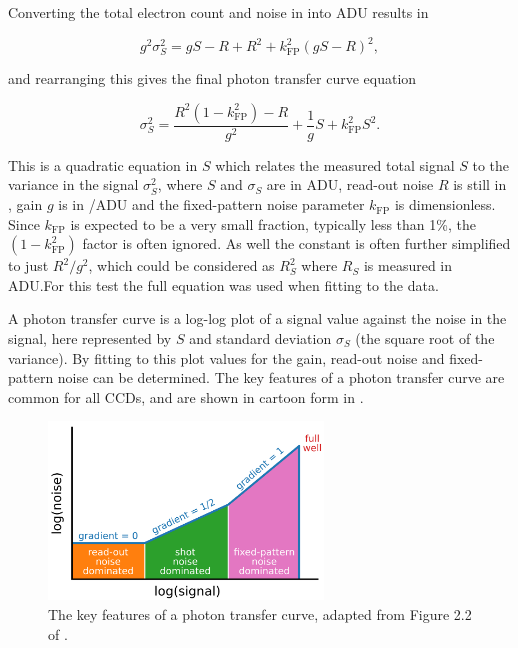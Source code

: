 \begin{colsection}
\begin{colsection}
Converting the total electron count and noise in  into ADU results in

\begin{equation}
    g^2\sigma_S^2 = gS - R + R^2 + k_\text{FP}^2 {(gS - R)}^2,
    \label{eq:ptc_noise2}
\end{equation}

and rearranging this gives the final photon transfer curve equation

\begin{equation}
    \sigma_S^2 = \frac{R^2(1-k_\text{FP}^2) - R}{g^2} + \frac{1}{g}S + k_\text{FP}^2 S^2.
    \label{eq:ptc}
\end{equation}

This is a quadratic equation in $S$ which relates the measured total signal $S$ to the variance in the signal $\sigma_S^2$, where $S$ and $\sigma_S$ are in ADU, read-out noise $R$ is still in \elec, gain $g$ is in \elec/ADU and the fixed-pattern noise parameter $k_\text{FP}$ is dimensionless. Since $k_\text{FP}$ is expected to be a very small fraction, typically less than 1\%, the $(1-k_\text{FP}^2)$ factor is often ignored. As well the constant is often further simplified to just $R^2/g^2$, which could be considered as $R_S^2$ where $R_S$ is measured in ADU.\@ For this test the full equation was used when fitting to the data.

A photon transfer curve is a log-log plot of a signal value against the noise in the signal, here represented by $S$ and standard deviation $\sigma_S$ (the square root of the variance). By fitting  to this plot values for the gain, read-out noise and fixed-pattern noise can be determined. The key features of a photon transfer curve are common for all CCDs, and are shown in cartoon form in .

\newpage

\begin{figure}[t]
    \begin{center}
        \includegraphics[width=0.65\textwidth]{images/ptc.pdf}
    \end{center}
    \caption[Key features of the photon transfer curve]{
        The key features of a photon transfer curve, adapted from Figure 2.2 of \citet{CCDs}.
        }\label{fig:ptc_cartoon}
\end{figure}


\end{colsection}
\end{colsection}
